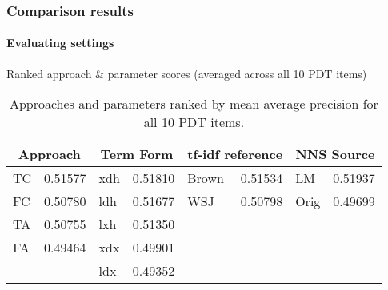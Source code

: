 \documentclass{beamer}
\begin{document}
\begin{frame}[noframenumbering]
\frametitle{Comparison results}
\framesubtitle{Evaluating settings}
Ranked approach \& parameter scores (averaged across all 10 PDT items)
\begin{center}
\footnotesize
\begin{table}
\begin{tabular}{|l|r||l|r||l|r||l|r|}
 \hline
 \multicolumn{2}{|c||}{Approach} & \multicolumn{2}{|c||}{Term Form} & \multicolumn{2}{|c||}{tf-idf reference} & \multicolumn{2}{|c|}{NNS Source} \\
 \hline
 \hline
 TC & 0.51577 & xdh & 0.51810 & Brown & 0.51534 & LM & 0.51937 \\
 \hline
 FC & 0.50780 & ldh & 0.51677 & WSJ & 0.50798 & Orig & 0.49699 \\
 \hline
 TA & 0.50755 & lxh & 0.51350 & & & & \\
 \hline
 FA & 0.49464 & xdx & 0.49901 & & & & \\
 \hline
 & 	& ldx & 0.49352 &  &  &  & \\
 \hline
\end{tabular}
\vspace{.7em}
\caption{Approaches and parameters ranked by mean average precision for all 10 PDT items.}
\label{tab:dist-ranked-parameters}
\end{table}
\end{center}
\end{frame}
\end{document}
